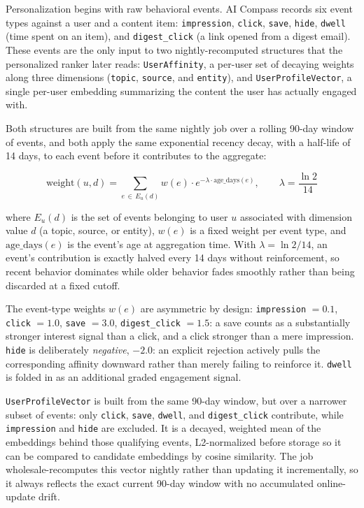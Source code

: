 Personalization begins with raw behavioral events. AI Compass records six event types against a user and a content item: \texttt{impression}, \texttt{click}, \texttt{save}, \texttt{hide}, \texttt{dwell} (time spent on an item), and \texttt{digest\_click} (a link opened from a digest email). These events are the only input to two nightly-recomputed structures that the personalized ranker later reads: \texttt{UserAffinity}, a per-user set of decaying weights along three dimensions (\texttt{topic}, \texttt{source}, and \texttt{entity}), and \texttt{UserProfileVector}, a single per-user embedding summarizing the content the user has actually engaged with.

Both structures are built from the same nightly job over a rolling 90-day window of events, and both apply the same exponential recency decay, with a half-life of 14 days, to each event before it contributes to the aggregate:

\begin{equation}
\text{weight}(u, d) = \sum_{e \,\in\, E_u(d)} w(e) \cdot e^{-\lambda \cdot \text{age\_days}(e)}, \qquad \lambda = \frac{\ln 2}{14}
\label{eq:affinity-decay}
\end{equation}

\noindent where $E_u(d)$ is the set of events belonging to user $u$ associated with dimension value $d$ (a topic, source, or entity), $w(e)$ is a fixed weight per event type, and $\text{age\_days}(e)$ is the event's age at aggregation time. With $\lambda = \ln 2/14$, an event's contribution is exactly halved every 14 days without reinforcement, so recent behavior dominates while older behavior fades smoothly rather than being discarded at a fixed cutoff.

The event-type weights $w(e)$ are asymmetric by design: \texttt{impression} $= 0.1$, \texttt{click} $= 1.0$, \texttt{save} $= 3.0$, \texttt{digest\_click} $= 1.5$: a save counts as a substantially stronger interest signal than a click, and a click stronger than a mere impression. \texttt{hide} is deliberately \emph{negative}, $-2.0$: an explicit rejection actively pulls the corresponding affinity downward rather than merely failing to reinforce it. \texttt{dwell} is folded in as an additional graded engagement signal.

\texttt{UserProfileVector} is built from the same 90-day window, but over a narrower subset of events: only \texttt{click}, \texttt{save}, \texttt{dwell}, and \texttt{digest\_click} contribute, while \texttt{impression} and \texttt{hide} are excluded. It is a decayed, weighted mean of the embeddings behind those qualifying events, L2-normalized before storage so it can be compared to candidate embeddings by cosine similarity. The job wholesale-recomputes this vector nightly rather than updating it incrementally, so it always reflects the exact current 90-day window with no accumulated online-update drift.

